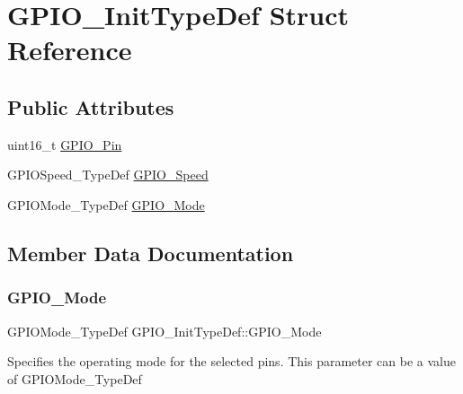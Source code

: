 \hypertarget{struct_g_p_i_o___init_type_def}{}\section{G\+P\+I\+O\+\_\+\+Init\+Type\+Def Struct Reference}
\label{struct_g_p_i_o___init_type_def}
\subsection*{Public Attributes}
\begin{DoxyCompactItemize}
\item 
uint16\+\_\+t \hyperlink{struct_g_p_i_o___init_type_def_a35fc26fc58226126c5b99478a472e5e9}{G\+P\+I\+O\+\_\+\+Pin}
\item 
G\+P\+I\+O\+Speed\+\_\+\+Type\+Def \hyperlink{struct_g_p_i_o___init_type_def_ac05832cacebc861a9acf5294d702c16b}{G\+P\+I\+O\+\_\+\+Speed}
\item 
G\+P\+I\+O\+Mode\+\_\+\+Type\+Def \hyperlink{struct_g_p_i_o___init_type_def_a55bd77e335c2bfeec9caa5dc922b791b}{G\+P\+I\+O\+\_\+\+Mode}
\end{DoxyCompactItemize}


\subsection{Member Data Documentation}
\mbox{\label{struct_g_p_i_o___init_type_def_a55bd77e335c2bfeec9caa5dc922b791b}} 
\subsubsection{\texorpdfstring{G\+P\+I\+O\+\_\+\+Mode}{GPIO\_Mode}}
{\footnotesize\ttfamily G\+P\+I\+O\+Mode\+\_\+\+Type\+Def G\+P\+I\+O\+\_\+\+Init\+Type\+Def\+::\+G\+P\+I\+O\+\_\+\+Mode}

Specifies the operating mode for the selected pins. This parameter can be a value of G\+P\+I\+O\+Mode\+\_\+\+Type\+Def \mbox{\label{struct_g_p_i_o___init_type_def_a35fc26fc58226126c5b99478a472e5e9}} 
